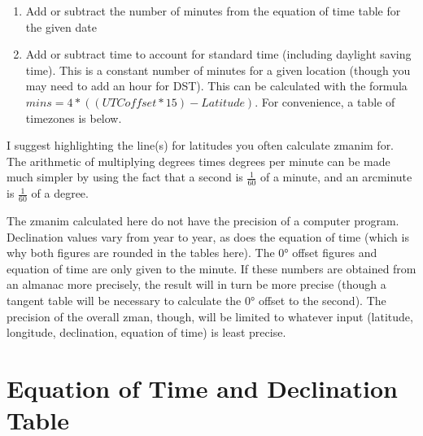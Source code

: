 \begin{enumerate}
	\item Add or subtract the number of minutes from the equation of time table for the given date
	\item Add or subtract time to account for standard time (including daylight saving time). This is a constant number of minutes for a given location (though you may need to add an hour for DST). This can be calculated with the formula $mins = 4 * \left(\left(UTCoffset * 15\right) - Latitude\right)$.  For convenience, a table of timezones is below.
\end{enumerate}

I suggest highlighting the line(s) for latitudes you often calculate zmanim for. The arithmetic of multiplying degrees times degrees per minute can be made much simpler by using the fact that a second is $\frac{1}{60}$ of a minute, and an arcminute is $\frac{1}{60}$ of a degree.

The zmanim calculated here do not have the precision of a computer program. Declination values vary from year to year, as does the equation of time (which is why both figures are rounded in the tables here). The 0° offset figures and equation of time are only given to the minute. If these numbers are obtained from an almanac more precisely, the result will in turn be more precise (though a tangent table will be necessary to calculate the 0° offset to the second). The precision of the overall zman, though, will be limited to whatever input (latitude, longitude, declination, equation of time) is least precise.

\section{Equation of Time and Declination Table}

